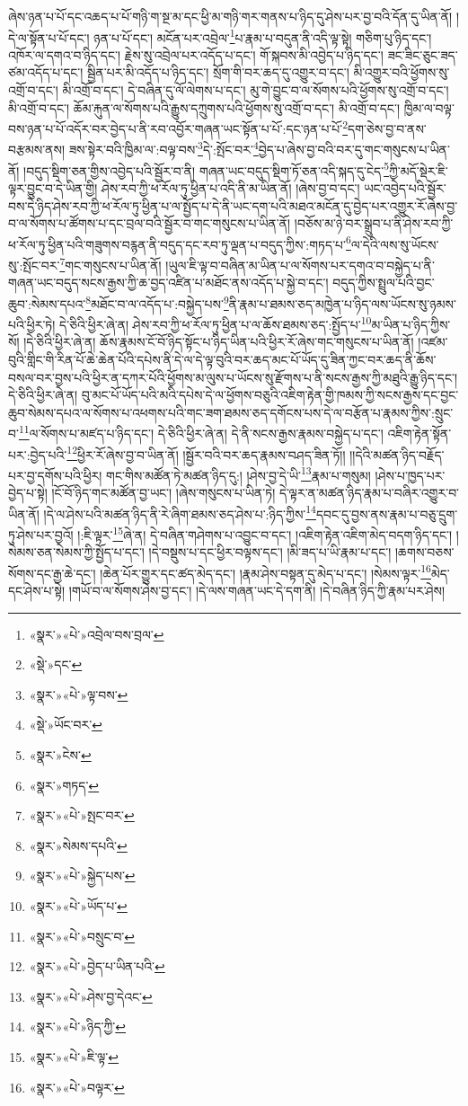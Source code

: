 ཞེས་ཉན་པ་པོ་དང་འཆད་པ་པོ་གཉི་ག་སྔ་མ་དང་ཕྱི་མ་གཉི་གར་གནས་པ་ཉིད་དུ་ཤེས་པར་བྱ་བའི་དོན་དུ་ཡིན་ནོ། །དེ་ལ་སྟོན་པ་པོ་དང་། ཉན་པ་པོ་དང་། མངོན་པར་འབྲེལ་\footnote{«སྣར་»«པེ་»འབྲེལ་བས་བྲལ་}པ་རྣམ་པ་བདུན་ནི་འདི་ལྟ་སྟེ། གཅིག་པུ་ཉིད་དང་། འཁོར་ལ་དགའ་བ་ཉིད་དང་། རྗེས་སུ་འབྲེལ་པར་འདོད་པ་དང་། གོ་སྐབས་མི་འབྱེད་པ་ཉིད་དང་། ཟང་ཟིང་ཅུང་ཟད་ཙམ་འདོད་པ་དང་། སྦྱིན་པར་མི་འདོད་པ་ཉིད་དང་། སྲོག་གི་བར་ཆད་དུ་འགྱུར་བ་དང་། མི་འགྱུར་བའི་ཕྱོགས་སུ་འགྲོ་བ་དང་། མི་འགྲོ་བ་དང་། དེ་བཞིན་དུ་ལོ་ལེགས་པ་དང་། མུ་གེ་བྱུང་བ་ལ་སོགས་པའི་ཕྱོགས་སུ་འགྲོ་བ་དང་། མི་འགྲོ་བ་དང་། ཆོམ་རྐུན་ལ་སོགས་པའི་རྒྱུས་དཀྲུགས་པའི་ཕྱོགས་སུ་འགྲོ་བ་དང་། མི་འགྲོ་བ་དང་། ཁྱིམ་ལ་བལྟ་བས་ཉན་པ་པོ་འདོར་བར་བྱེད་པ་ནི་རབ་འབྱོར་གཞན་ཡང་སྟོན་པ་པོ་:དང་ཉན་པ་པོ་\footnote{«སྡེ་»དང་}དག་ཅེས་བྱ་བ་ནས་བརྩམས་ནས། ཟས་སྟེར་བའི་ཁྱིམ་ལ་:བལྟ་བས་\footnote{«སྣར་»«པེ་»ལྟ་བས་}དེ་:སྤོང་བར་\footnote{«སྡེ་»ཡོང་བར་}བྱེད་པ་ཞེས་བྱ་བའི་བར་དུ་གང་གསུངས་པ་ཡིན་ནོ། །བདུད་སྡིག་ཅན་གྱིས་འབྱེད་པའི་སྦྱོར་བ་ནི། གཞན་ཡང་བདུད་སྡིག་ཏོ་ཅན་འདི་སྐད་དུ་ངེད་\footnote{«སྣར་»ངེས་}ཀྱི་མདོ་སྡེར་ཇི་ལྟར་བྱུང་བ་དེ་ཡིན་གྱི། ཤེས་རབ་ཀྱི་ཕ་རོལ་ཏུ་ཕྱིན་པ་འདི་ནི་མ་ཡིན་ནོ། །ཞེས་བྱ་བ་དང་། ཡང་འབྱེད་པའི་སྦྱོར་བས་དེ་ཉིད་ཤེས་རབ་ཀྱི་ཕ་རོལ་ཏུ་ཕྱིན་པ་ལ་སྤྱོད་པ་དེ་ནི་ཡང་དག་པའི་མཐའ་མངོན་དུ་བྱེད་པར་འགྱུར་རོ་ཞེས་བྱ་བ་ལ་སོགས་པ་ཚོགས་པ་དང་བྲལ་བའི་སྦྱོར་བ་གང་གསུངས་པ་ཡིན་ནོ། །བཅོས་མ་ཉེ་བར་སྒྲུབ་པ་ནི་ཤེས་རབ་ཀྱི་ཕ་རོལ་ཏུ་ཕྱིན་པའི་གཟུགས་བརྙན་ནི་བདུད་དང་རབ་ཏུ་ལྡན་པ་བདུད་ཀྱིས་:གཏད་པ་\footnote{«སྣར་»གཏད་}ལ་དེའི་ལས་སུ་ཡོངས་སུ་:སྤོང་བར་\footnote{«སྣར་»«པེ་»སྤང་བར་}གང་གསུངས་པ་ཡིན་ནོ། །ཡུལ་ཇི་ལྟ་བ་བཞིན་མ་ཡིན་པ་ལ་སོགས་པར་དགའ་བ་བསྐྱེད་པ་ནི་གཞན་ཡང་བདུད་སངས་རྒྱས་ཀྱི་ཆ་བྱད་འཛིན་པ་མཐོང་ནས་འདོད་པ་སྐྱེ་བ་དང་། བདུད་ཀྱིས་སྤྲུལ་པའི་བྱང་ཆུབ་:སེམས་དཔའ་\footnote{«སྣར་»སེམས་དཔའི་}མཐོང་བ་ལ་འདོད་པ་:བསྐྱེད་པས་\footnote{«སྣར་»«པེ་»སྐྱེད་པས་}ནི་རྣམ་པ་ཐམས་ཅད་མཁྱེན་པ་ཉིད་ལས་ཡོངས་སུ་ཉམས་པའི་ཕྱིར་ཏེ། དེ་ཅིའི་ཕྱིར་ཞེ་ན། ཤེས་རབ་ཀྱི་ཕ་རོལ་ཏུ་ཕྱིན་པ་ལ་ཆོས་ཐམས་ཅད་:སྤྱོད་པ་\footnote{«སྣར་»«པེ་»ཡོད་པ་}མ་ཡིན་པ་ཉིད་ཀྱིས་སོ། །དེ་ཅིའི་ཕྱིར་ཞེ་ན། ཆོས་རྣམས་ངོ་བོ་ཉིད་སྟོང་པ་ཉིད་ཡིན་པའི་ཕྱིར་རོ་ཞེས་གང་གསུངས་པ་ཡིན་ནོ། །འཛམ་བུའི་གླིང་གི་རིན་པོ་ཆེ་ཆེན་པོའི་དཔེས་ནི་དེ་ལ་དེ་ལྟ་བུའི་བར་ཆད་མང་པོ་ཡོད་དུ་ཟིན་ཀྱང་བར་ཆད་ནི་ཆོས་བསལ་བར་བྱས་པའི་ཕྱིར་ན་དཀར་པོའི་ཕྱོགས་མ་ལུས་པ་ཡོངས་སུ་རྫོགས་པ་ནི་སངས་རྒྱས་ཀྱི་མཐུའི་རྒྱུ་ཉིད་དང་། དེ་ཅིའི་ཕྱིར་ཞེ་ན། བུ་མང་པོ་ཡོད་པའི་མའི་དཔེས་དེ་ལ་ཕྱོགས་བཅུའི་འཇིག་རྟེན་གྱི་ཁམས་ཀྱི་སངས་རྒྱས་དང་བྱང་ཆུབ་སེམས་དཔའ་ལ་སོགས་པ་འཕགས་པའི་གང་ཟག་ཐམས་ཅད་དགོངས་པས་དེ་ལ་བརྩོན་པ་རྣམས་ཀྱིས་:སྲུང་བ་\footnote{«སྣར་»«པེ་»བསྲུང་བ་}ལ་སོགས་པ་མཛད་པ་ཉིད་དང་། དེ་ཅིའི་ཕྱིར་ཞེ་ན། དེ་ནི་སངས་རྒྱས་རྣམས་བསྐྱེད་པ་དང་། འཇིག་རྟེན་སྟོན་པར་:བྱེད་པའི་\footnote{«སྣར་»«པེ་»བྱེད་པ་ཡིན་པའི་}ཕྱིར་རོ་ཞེས་བྱ་བ་ཡིན་ནོ། །སྦྱོར་བའི་བར་ཆད་རྣམས་བཤད་ཟིན་ཏོ།། །།དེའི་མཚན་ཉིད་བརྗོད་པར་བྱ་དགོས་པའི་ཕྱིར། གང་གིས་མཚོན་ཏེ་མཚན་ཉིད་དུ:། །ཤེས་བྱ་དེ་ཡི་\footnote{«སྣར་»«པེ་»ཤེས་བྱ་དེའང་}རྣམ་པ་གསུམ། །ཤེས་པ་ཁྱད་པར་བྱེད་པ་སྟེ། །ངོ་བོ་ཉིད་གང་མཚོན་བྱ་ཡང་། །ཞེས་གསུངས་པ་ཡིན་ཏེ། དེ་ལྟར་ན་མཚན་ཉིད་རྣམ་པ་བཞིར་འགྱུར་བ་ཡིན་ནོ། །དེ་ལ་ཤེས་པའི་མཚན་ཉིད་ནི་རེ་ཞིག་ཐམས་ཅད་ཤེས་པ་:ཉིད་ཀྱིས་\footnote{«སྣར་»«པེ་»ཉིད་ཀྱི་}དབང་དུ་བྱས་ནས་རྣམ་པ་བཅུ་དྲུག་ཏུ་ཤེས་པར་བྱའོ། །:ཇི་ལྟར་\footnote{«སྣར་»«པེ་»ཇི་ལྟ་}ཞེ་ན། དེ་བཞིན་གཤེགས་པ་འབྱུང་བ་དང་། །འཇིག་རྟེན་འཇིག་མེད་བདག་ཉིད་དང་། །སེམས་ཅན་སེམས་ཀྱི་སྤྱོད་པ་དང་། །དེ་བསྡུས་པ་དང་ཕྱིར་བལྟས་དང་། །མི་ཟད་པ་ཡི་རྣམ་པ་དང་། །ཆགས་བཅས་སོགས་དང་རྒྱ་ཆེ་དང་། །ཆེན་པོར་གྱུར་དང་ཚད་མེད་དང་། །རྣམ་ཤེས་བསྟན་དུ་མེད་པ་དང་། །སེམས་ལྟར་\footnote{«སྣར་»«པེ་»བལྟར་}མེད་དང་ཤེས་པ་སྟེ། །གཡོ་བ་ལ་སོགས་ཤེས་བྱ་དང་། །དེ་ལས་གཞན་ཡང་དེ་དག་ནི། །དེ་བཞིན་ཉིད་ཀྱི་རྣམ་པར་ཤེས། 